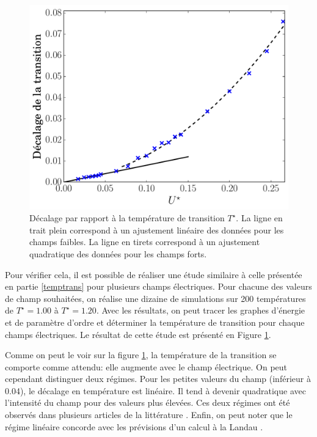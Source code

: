 \documentclass[11pt]{article}
\numberwithin{equation}{section}
\begin{document}
\begin{figure}[h!]
    \centering      
    \includegraphics[scale=0.6]{figures/electricField.pdf}
    \caption{Décalage par rapport à la température de transition $T^\star$. La ligne en trait plein correspond à un ajustement linéaire des données pour les champs faibles. La ligne en tirets correspond à un ajustement quadratique des données pour les champs forts.}
        \label{electricField} 
\end{figure}

Pour vérifier cela, il est possible de réaliser une étude similaire à celle présentée en partie \ref{temptrans} pour plusieurs champs électriques. Pour chacune des valeurs de champ souhaitées, on réalise une dizaine de simulations sur 200 températures de $T^\star = 1.00$ à $T^\star = 1.20$. Avec les résultats, on peut tracer les graphes d'énergie et de paramètre d'ordre et déterminer la température de transition pour chaque champs électriques. Le résultat de cette étude est présenté en Figure \ref{electricField}.
\medskip

Comme on peut le voir sur la figure \ref{electricField}, la température de la transition se comporte comme attendu: elle augmente avec le champ électrique. On peut cependant distinguer deux régimes. Pour les petites valeurs du champ (inférieur à 0.04), le décalage en température est linéaire. Il tend à devenir quadratique avec l'intensité du champ pour des valeurs plus élevées. Ces deux régimes ont été observés dans plusieurs articles de la littérature \cite{entropicelectric, field}. Enfin, on peut noter que le régime linéaire concorde avec les prévisions d'un calcul à la Landau \cite{landau}.
\newpage
\end{document}
